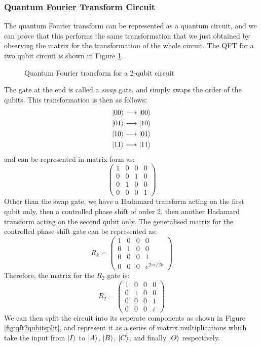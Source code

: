 \subsubsection{Quantum Fourier Transform Circuit}
The quantum Fourier transform can be represented as a quantum circuit, and we can prove that this performs the same transformation that we just obtained by observing the matrix for the transformation of the whole circuit. The QFT for a two qubit circuit is shown in Figure \ref{fig:qft2qubit}.
\begin{figure}[!htb]
\centering
\resizebox{5cm}{!}{}
\caption{Quantum Fourier transform for a 2-qubit circuit}
\label{fig:qft2qubit}
\end{figure}
The gate at the end is called a \emph{swap} gate, and simply swaps the order of the qubits. This transformation is then as follows:
\begin{align*}
    \ket{00} \longrightarrow \ket{00}\\
    \ket{01} \longrightarrow \ket{10}\\
    \ket{10} \longrightarrow \ket{01}\\
    \ket{11} \longrightarrow \ket{11}
\end{align*}
and can be represented in matrix form as:
$$
\begin{pmatrix}
1 & 0 & 0 & 0\\
0 & 0 & 1 & 0\\
0 & 1 & 0 & 0\\
0 & 0 & 0 & 1
\end{pmatrix}
$$
Other than the swap gate, we have a Hadamard transform acting on the first qubit only, then a controlled phase shift of order 2, then another Hadamard transform acting on the second qubit only. The generalised matrix for the controlled phase shift gate can be represented as:
$$
R_k = 
\begin{pmatrix}
1 & 0 & 0 & 0\\
0 & 1 & 0 & 0\\
0 & 0 & 0 & 1\\
0 & 0 & 0 &e^{2\pi i/2k}
\end{pmatrix}
$$
Therefore, the matrix for the $R_2$ gate is:
$$
R_2 = 
\begin{pmatrix}
1 & 0 & 0 & 0\\
0 & 1 & 0 & 0\\
0 & 0 & 0 & 1\\
0 & 0 & 0 & i
\end{pmatrix}
$$
We can then split the circuit into its seperate components as shown in Figure \ref{fig:qft2qubitsplit}, and represent it as a series of matrix multiplications which take the input from $\ket{I}$ to $\ket{A}$, $\ket{B}$, $\ket{C}$, and finally $\ket{O}$ respectively. 
